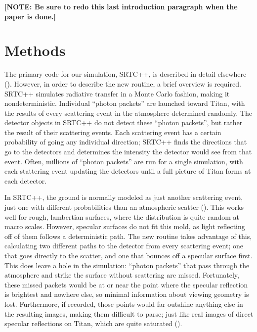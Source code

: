 \documentclass{article}
\begin{document}
\textbf{\color{red} [NOTE: Be sure to redo this last introduction paragraph when the paper is done.] \color{black}}

\section{Methods}
The primary code for our simulation, SRTC++, is described in detail elsewhere (\cite{Barnes2018}). However, in order to describe the new routine, a brief overview is required. SRTC++ simulates radiative transfer in a Monte Carlo fashion, making it nondeterministic. Individual ``photon packets'' are launched toward Titan, with the results of every scattering event in the atmosphere determined randomly. The detector objects in SRTC++ do not detect these ``photon packets'', but rather the result of their scattering events. Each scattering event has a certain probability of going any individual direction; SRTC++ finds the directions that go to the detectors and determines the intensity the detector would see from that event. Often, millions of ``photon packets'' are run for a single simulation, with each stattering event updating the detectors until a full picture of Titan forms at each detector.

In SRTC++, the ground is normally modeled as just another scattering event, just one with different probabilities than an atmospheric scatter (\cite{Barnes2018}). This works well for rough, lambertian surfaces, where the distribution is quite random at macro scales. However, specular surfaces do not fit this mold, as light reflecting off of them follows a deterministic path.  The new routine takes advantage of this, calculating two different paths to the detector from every scattering event; one that goes directly to the scatter, and one that bounces off a specular surface first. This does leave a hole in the simulation: ``photon packets'' that pass through the atmosphere and strike the surface without scattering are missed. Fortunately, these missed packets would be at or near the point where the specular reflection is brightest and nowhere else, so minimal information about viewing geometry is lost. Furthermore, if recorded, those points would far outshine anything else in the resulting images, making them difficult to parse; just like real images of direct specular reflections on Titan, which are quite saturated (\cite{Barnes2013}).
\end{document}
